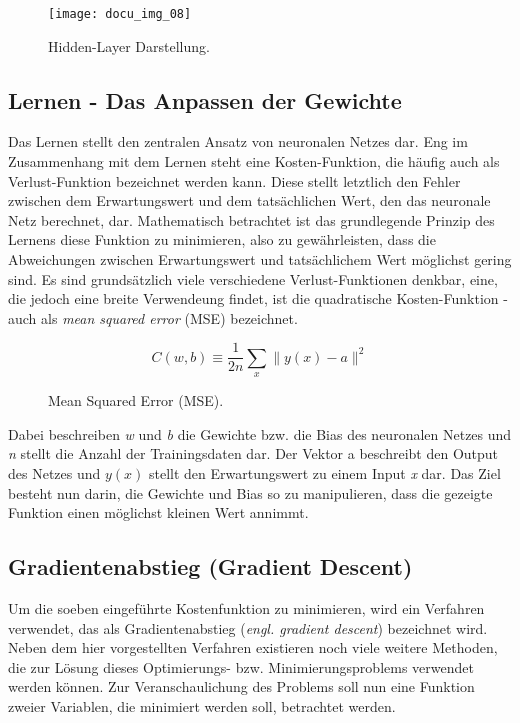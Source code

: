 \begin{figure}[h]
    \centering
    \texttt{[image: docu\_img\_08]}
    \caption{Hidden-Layer Darstellung.}
    \label{fig:hidden-layers}
\end{figure}

\subsection{Lernen - Das Anpassen der Gewichte}

Das Lernen stellt den zentralen Ansatz von neuronalen Netzes dar. Eng im Zusammenhang mit dem Lernen steht eine
Kosten-Funktion, die häufig auch als Verlust-Funktion bezeichnet werden kann. Diese stellt letztlich den Fehler zwischen
dem Erwartungswert und dem tatsächlichen Wert, den das neuronale Netz berechnet, dar. Mathematisch betrachtet ist das
grundlegende Prinzip des Lernens diese Funktion zu minimieren, also zu gewährleisten, dass die Abweichungen zwischen
Erwartungswert und tatsächlichem Wert möglichst gering sind. Es sind grundsätzlich viele verschiedene Verlust-Funktionen
denkbar, eine, die jedoch eine breite Verwendeung findet, ist die quadratische Kosten-Funktion - auch als \textit{mean squared
error} (MSE) bezeichnet.

\begin{figure}[h]
    \centering
    \[ C(w, b) \equiv
          \frac{1}{2n}\displaystyle\sum_{x}{\parallel y(x) - a\parallel^2}
    \]
    \caption{Mean Squared Error (MSE).}
    \label{fig:learn-function}
\end{figure}

Dabei beschreiben \textit{w} und \textit{b} die Gewichte bzw. die Bias des neuronalen Netzes und \textit{n} stellt die Anzahl der Trainingsdaten
dar. Der Vektor a beschreibt den Output des Netzes und \textit{\(y(x)\)} stellt den Erwartungswert zu einem Input \textit{x} dar.
Das Ziel besteht nun darin, die Gewichte und Bias so zu manipulieren, dass die gezeigte Funktion einen möglichst kleinen
Wert annimmt.

\subsection{Gradientenabstieg (Gradient Descent)}

Um die soeben eingeführte Kostenfunktion zu minimieren, wird ein Verfahren verwendet, das als Gradientenabstieg (\textit{engl.
gradient descent}) bezeichnet wird. Neben dem hier vorgestellten Verfahren existieren noch viele weitere Methoden, die
zur Lösung dieses Optimierungs- bzw. Minimierungsproblems verwendet werden können.
Zur Veranschaulichung des Problems soll nun eine Funktion zweier Variablen, die minimiert werden soll, betrachtet werden.

